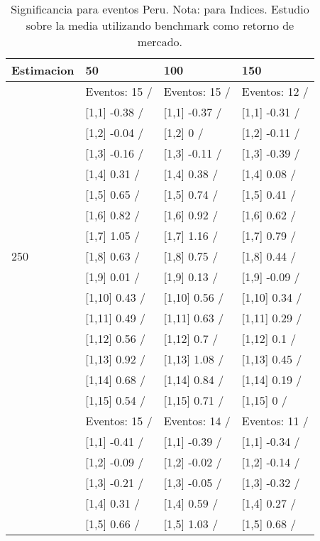 \begin{table}

\caption{Significancia para eventos Peru. Nota: para Indices. Estudio sobre la media utilizando benchmark como retorno de mercado.}
\centering
\begin{tabular}[t]{llll}
\toprule
Estimacion & 50 & 100 & 150\\
\midrule
 & Eventos:  15 / & Eventos:  15 / & Eventos:  12 /\\
 & {}[1,1] -0.38  / & {}[1,1] -0.37  / & {}[1,1] -0.31  /\\
 & {}[1,2] -0.04  / & {}[1,2] 0  / & {}[1,2] -0.11  /\\
 & {}[1,3] -0.16  / & {}[1,3] -0.11  / & {}[1,3] -0.39  /\\
 & {}[1,4] 0.31  / & {}[1,4] 0.38  / & {}[1,4] 0.08  /\\
\addlinespace
 & {}[1,5] 0.65  / & {}[1,5] 0.74  / & {}[1,5] 0.41  /\\
 & {}[1,6] 0.82  / & {}[1,6] 0.92  / & {}[1,6] 0.62  /\\
 & {}[1,7] 1.05  / & {}[1,7] 1.16  / & {}[1,7] 0.79  /\\
250 & {}[1,8] 0.63  / & {}[1,8] 0.75  / & {}[1,8] 0.44  /\\
 & {}[1,9] 0.01  / & {}[1,9] 0.13  / & {}[1,9] -0.09  /\\
\addlinespace
 & {}[1,10] 0.43  / & {}[1,10] 0.56  / & {}[1,10] 0.34  /\\
 & {}[1,11] 0.49  / & {}[1,11] 0.63  / & {}[1,11] 0.29  /\\
 & {}[1,12] 0.56  / & {}[1,12] 0.7  / & {}[1,12] 0.1  /\\
 & {}[1,13] 0.92  / & {}[1,13] 1.08  / & {}[1,13] 0.45  /\\
 & {}[1,14] 0.68  / & {}[1,14] 0.84  / & {}[1,14] 0.19  /\\
\addlinespace
 & {}[1,15] 0.54  / & {}[1,15] 0.71  / & {}[1,15] 0  /\\
 & Eventos:  15 / & Eventos:  14 / & Eventos:  11 /\\
 & {}[1,1] -0.41  / & {}[1,1] -0.39  / & {}[1,1] -0.34  /\\
 & {}[1,2] -0.09  / & {}[1,2] -0.02  / & {}[1,2] -0.14  /\\
 & {}[1,3] -0.21  / & {}[1,3] -0.05  / & {}[1,3] -0.32  /\\
\addlinespace
 & {}[1,4] 0.31  / & {}[1,4] 0.59  / & {}[1,4] 0.27  /\\
 & {}[1,5] 0.66  / & {}[1,5] 1.03  / & {}[1,5] 0.68  /\\

\end{tabular}
\end{table}
